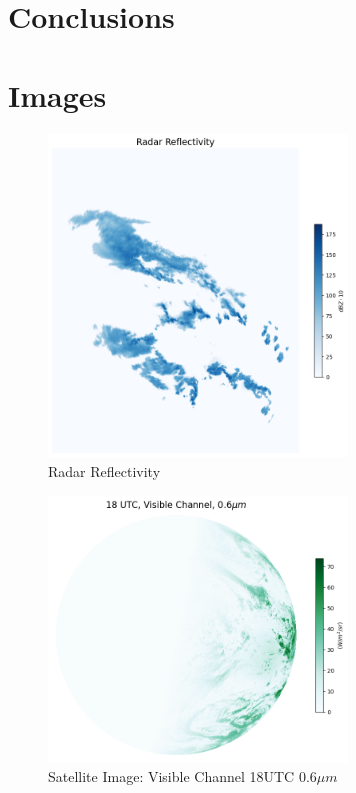 \documentclass[acmtog, authorversion]{acmart}
\begin{document}
\section{Conclusions}






\appendix

\section{Images}

\begin{figure}[hbp]
  \centering
  \includegraphics[width=225pt]{./images/radar_reflectivity.png}
  \caption{Radar Reflectivity}
  \Description{}
  \label{fig:reflect}
\end{figure}

\begin{figure}[hbp]
  \centering
  \includegraphics[width=225pt]{./images/vis_006.png}
  \caption{Satellite Image: Visible Channel 18UTC $0.6\mu m$}
  \Description{}
  \label{fig:vis}
\end{figure}
\end{document}

